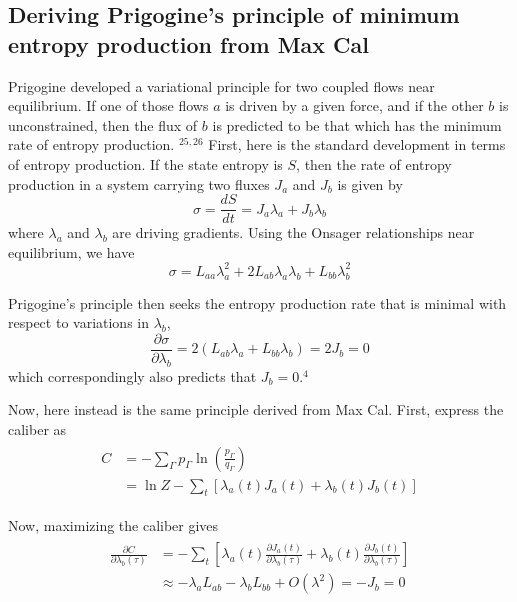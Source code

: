 \documentclass[aps,pra,twocolumn]{revtex4-1}
\begin{document}
\subsection{Deriving Prigogine's principle of minimum entropy production from Max Cal}

Prigogine developed a variational principle for two coupled flows near equilibrium. If one of those flows $a$ is driven by a given force, and if the other $b$ is unconstrained, then the flux of $b$ is predicted to be that which has the minimum rate of entropy production. ${ }^{25,26}$ First, here is the standard development in terms of entropy production. If the state entropy is $S$, then the rate of entropy production in a system carrying two fluxes $J_a$ and $J_b$ is given by
\begin{equation}
\sigma=\frac{d S}{d t}=J_a \lambda_a+J_b \lambda_b
\end{equation}
where $\lambda_a$ and $\lambda_b$ are driving gradients. Using the Onsager relationships near equilibrium, we have
\begin{equation}    
\sigma=L_{a a} \lambda_a^2+2 L_{a b} \lambda_a \lambda_b+L_{b b} \lambda_b^2
\end{equation}

Prigogine's principle then seeks the entropy production rate that is minimal with respect to variations in $\lambda_b$,
\begin{equation}
\frac{\partial \sigma}{\partial \lambda_b}=2\left(L_{a b} \lambda_a+L_{b b} \lambda_b\right)=2 J_b=0
\end{equation}
which correspondingly also predicts that $J_b=0$.${ }^4$

Now, here instead is the same principle derived from Max Cal. First, express the caliber as
\begin{eqnarray}
\begin{aligned}
C & =-\sum_{\Gamma} p_{\Gamma} \ln \left(\frac{p_{\Gamma}}{q_{\Gamma}}\right) \nonumber\\
& =\ln Z-\sum_t\left[\lambda_a(t) J_a(t)+\lambda_b(t) J_b(t)\right] \label{eq:caliber_expression}
\end{aligned}
\end{eqnarray}

Now, maximizing the caliber gives
\begin{eqnarray}
\begin{aligned}
\frac{\partial C}{\partial \lambda_b(\tau)} & =-\sum_t\left[\lambda_a(t) \frac{\partial J_a(t)}{\partial \lambda_b(\tau)}+\lambda_b(t) \frac{\partial J_b(t)}{\partial \lambda_b(\tau)}\right] \nonumber\\
& \approx-\lambda_a L_{a b}-\lambda_b L_{b b}+O\left(\lambda^2\right)=-J_b=0
\end{aligned}
\end{eqnarray}
\end{document}
